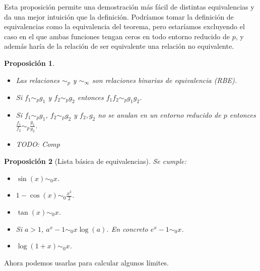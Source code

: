 \documentclass{article}
\newtheorem{prop}{Proposición}
\begin{document}
Esta proposición permite una demostración más fácil de distintas equivalencias y da una mejor intuición que la definición. Podríamos tomar la definición de equivalencias como la equivalencia del teorema, pero estaríamos excluyendo el caso en el que ambas funciones tengan ceros en todo entorno reducido de $p$, y además haría de la relación de ser equivalente una relación no equivalente.

\begin{prop}
	\begin{itemize}
		\item
		Las relaciones $\sim_p$ y $\sim_{\infty}$ son relaciones binarias de equivalencia (RBE).
		
		\item
		Si $f_1 \sim_p g_1$ y $f_2 \sim_p g_2$ entonces $f_1 f_2 \sim_p g_1 g_2$.
		
		\item
		Si $f_1 \sim_p g_1$, $f_2 \sim_p g_2$ y $f_2,g_2$ no se anulan en un entorno reducido de $p$ entonces $\frac{f_1}{f_2} \sim_p \frac{g_1}{g_2}$.
		
		\item
		TODO: Comp
	\end{itemize}
\end{prop}

\begin{prop}[Lista básica de equivalencias]
	Se cumple:
	\begin{itemize}
		\item
		$\sin(x) \sim_0 x$.
		
		\item
		$1 - \cos(x) \sim_0 \frac{x^2}{2}$.
		
		\item
		$\tan(x) \sim_0 x$.		
		
		\item
		Si $a > 1$, $a^x - 1\sim_0 x\log(a)$. En concreto $e^x - 1 \sim_0 x$.

		\item
		$\log(1 + x) \sim_0 x$.		
		
	\end{itemize}
\end{prop}

Ahora podemos usarlas para calcular algunos límites.
\end{document}
